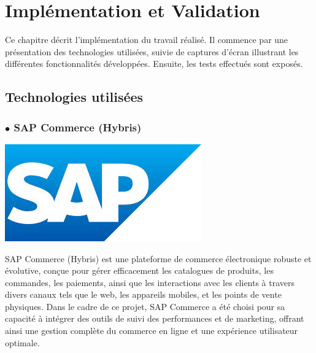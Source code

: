 \chapter{Implémentation et Validation}
\label{chap:Implémentation et Validation}


Ce chapitre décrit l'implémentation du travail réalisé. Il commence par une présentation des technologies utilisées, suivie de captures d'écran illustrant les différentes fonctionnalités développées. Ensuite, les tests effectués sont exposés.
\newpage
\section{Technologies utilisées}
\subsection*{$\bullet$ SAP Commerce (Hybris)}
\begin{center}
    \centering
    \includegraphics[scale=0.5]{Figures/SAP.jpg}
    \label{fig:processus}
\end{center} 

SAP Commerce (Hybris) est une plateforme de commerce électronique robuste et évolutive, conçue pour gérer efficacement les catalogues de produits, les commandes, les paiements, ainsi que les interactions avec les clients à travers divers canaux tels que le web, les appareils mobiles, et les points de vente physiques. Dans le cadre de ce projet, SAP Commerce a été choisi pour sa capacité à intégrer des outils de suivi des performances et de marketing, offrant ainsi une gestion complète du commerce en ligne et une expérience utilisateur optimale.

